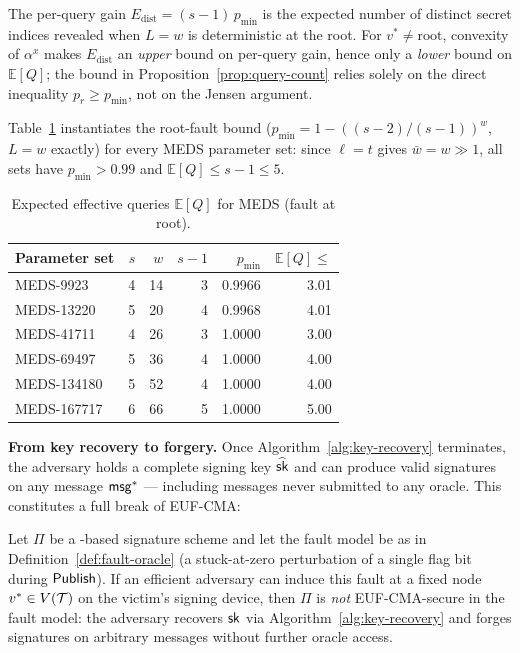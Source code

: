 \begin{remark}
\label{rem:edist}
The per-query gain $E_{\mathrm{dist}} = (s-1)\,p_{\min}$ is the expected number
of distinct secret indices revealed when $L = w$ is deterministic at the root.
For $v^* \neq \mathrm{root}$, convexity of $\alpha^x$ makes $E_{\mathrm{dist}}$
an \emph{upper} bound on per-query gain, hence only a \emph{lower} bound on
$\mathbb{E}[Q]$; the bound in Proposition~\ref{prop:query-count} relies solely
on the direct inequality $p_r \geq p_{\min}$, not on the Jensen argument.
\end{remark}

Table~\ref{tab:meds-eq} instantiates the root-fault bound
($p_{\min} = 1 - ((s-2)/(s-1))^w$, $L = w$ exactly) for every MEDS parameter
set: since $\ell = t$ gives $\bar{w} = w \gg 1$, all sets have
$p_{\min} > 0.99$ and $\mathbb{E}[Q] \leq s-1 \leq 5$.

\begin{table}[h]
\centering
\caption{Expected effective queries $\mathbb{E}[Q]$ for MEDS (fault at root).}
\label{tab:meds-eq}
\begin{tabular}{@{}lrrrrr@{}}
\toprule
Parameter set & $s$ & $w$ & $s{-}1$ & $p_{\min}$ & $\mathbb{E}[Q] \leq$ \\
\midrule
MEDS-9923   & 4 &  14 & 3 & 0.9966 & 3.01 \\
MEDS-13220  & 5 &  20 & 4 & 0.9968 & 4.01 \\
MEDS-41711  & 4 &  26 & 3 & 1.0000 & 3.00 \\
MEDS-69497  & 5 &  36 & 4 & 1.0000 & 4.00 \\
MEDS-134180 & 5 &  52 & 4 & 1.0000 & 4.00 \\
MEDS-167717 & 6 &  66 & 5 & 1.0000 & 5.00 \\
\bottomrule
\end{tabular}
\end{table}

\noindent\textbf{From key recovery to forgery.}
Once Algorithm~\ref{alg:key-recovery} terminates, the adversary holds
a complete signing key $\widehat{\mathsf{sk}}$ and can produce valid signatures
on any message $\mathsf{msg}^*$ — including messages never submitted to any
oracle.  This constitutes a full break of EUF-CMA:

\begin{corollary}
\label{cor:euf-cma}
Let $\Pi$ be a \GZKST-based signature scheme and let the fault model be as in
Definition~\ref{def:fault-oracle} (a stuck-at-zero perturbation of a single
flag bit during $\mathsf{Publish}$).  If an efficient adversary can induce this fault
at a fixed node $v^* \in V(\mathcal{T})$ on the victim's signing device, then
$\Pi$ is \emph{not} \textrm{EUF-CMA}-secure in the fault model: the adversary
recovers $\mathsf{sk}$ via Algorithm~\ref{alg:key-recovery} and forges signatures on
arbitrary messages without further oracle access.
\end{corollary}
